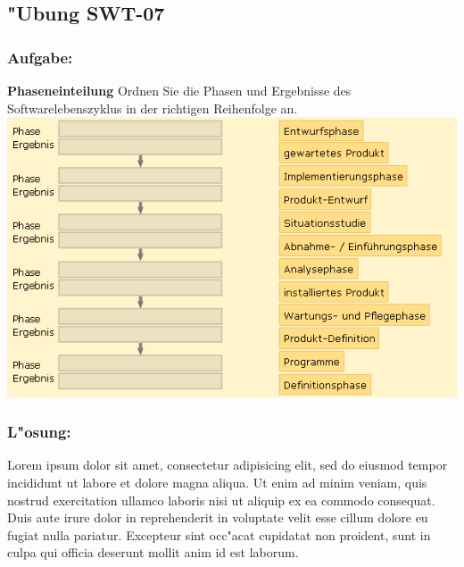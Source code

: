 \newpage
\subsection{"Ubung SWT-07}
\subsubsection*{Aufgabe:}

\begin{framed}
\textbf{Phaseneinteilung}
\smallbreak
Ordnen Sie die Phasen und Ergebnisse des Softwarelebenszyklus in der richtigen Reihenfolge an.
\bigbreak
\includegraphics[width=1.0\textwidth]{./images/ueb01-07.png}
\end{framed}
\bigbreak
\bigbreak
\subsubsection*{L"osung:}
Lorem ipsum dolor sit amet, consectetur adipisicing elit, sed do eiusmod tempor incididunt ut labore et dolore magna aliqua. Ut enim ad minim veniam, quis nostrud exercitation ullamco laboris nisi ut aliquip ex ea commodo consequat. Duis aute irure dolor in reprehenderit in voluptate velit esse cillum dolore eu fugiat nulla pariatur. Excepteur sint occ"acat cupidatat non proident, sunt in culpa qui officia deserunt mollit anim id est laborum.










\clearpage
\setlength\bibitemsep{10pt}
\printbibliography[heading=bibintoc]
\newpage
\printglossary[type=main]
\printglossary[type=\acronymtype]




